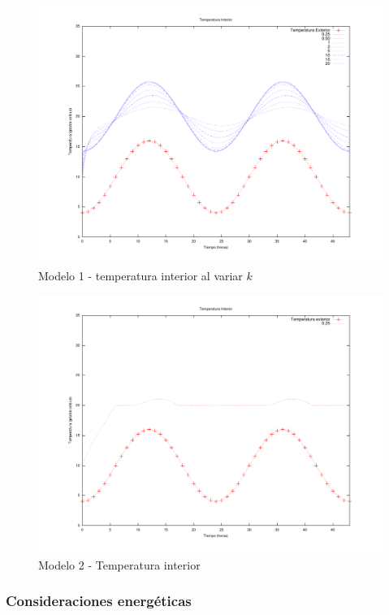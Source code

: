 \documentclass{sig-alternate}
\begin{document}
\begin{figure}[hp]
\label{primer_modelo_variar_k}
\centering
\includegraphics[scale=.8]{graficos/ej1b}
\caption{Modelo 1 - temperatura interior al variar $k$}
\end{figure}

\begin{figure}[hp]
\label{segundo_modelo_k_un_cuarto}
\centering
\includegraphics[scale=0.8]{graficos/modelo2}
\caption{Modelo 2 - Temperatura interior}
\end{figure}

\subsubsection{Consideraciones energ\'{e}ticas}
\end{document}
